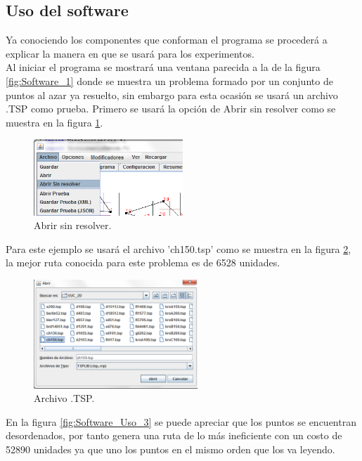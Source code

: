 \subsection{Uso del software}
Ya conociendo los componentes que conforman el programa se procederá a explicar la manera en que se usará para los experimentos.\\
\hspace*{1cm}Al iniciar el programa se mostrará una ventana parecida a la de la figura \ref {fig:Software_1} donde se muestra un problema formado por un conjunto de puntos al azar ya resuelto, sin embargo para esta ocasión se usará un archivo .TSP como prueba. Primero se usará la opción de Abrir sin resolver como se muestra en la figura \ref {fig:Software_Uso_1}.
     \begin{figure}[hbtp]
        \centering
            \includegraphics[width=0.5\textwidth]{Software/Imagenes/Software_Uso_1.png}
            \caption{Abrir sin resolver.}
            \label{fig:Software_Uso_1}
    \end{figure}
    
\hspace*{1cm}Para este ejemplo se usará el archivo 'ch150.tsp' como se muestra en la figura \ref {fig:Software_Uso_2}, la mejor ruta conocida para este problema es de 6528 unidades. 
     \begin{figure}[hbtp]
        \centering
            \includegraphics[width=0.55\textwidth]{Software/Imagenes/Software_Uso_2.png}
            \caption{Archivo .TSP.}
            \label{fig:Software_Uso_2}
    \end{figure}
    
\hspace*{1cm}En la figura \ref {fig:Software_Uso_3} se puede apreciar que los puntos se encuentran desordenados, por tanto genera una ruta de lo más ineficiente con un costo de 52890 unidades ya que uno los puntos en el mismo orden que los va leyendo.\\

